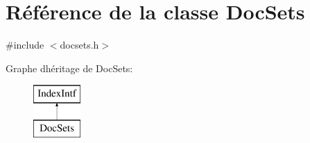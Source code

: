 \hypertarget{class_doc_sets}{}\section{Référence de la classe Doc\+Sets}
\label{class_doc_sets}


{\ttfamily \#include $<$docsets.\+h$>$}

Graphe d\textquotesingle{}héritage de Doc\+Sets\+:\begin{figure}[H]
\begin{center}
\leavevmode
\includegraphics[height=2.000000cm]{class_doc_sets}
\end{center}
\end{figure}

